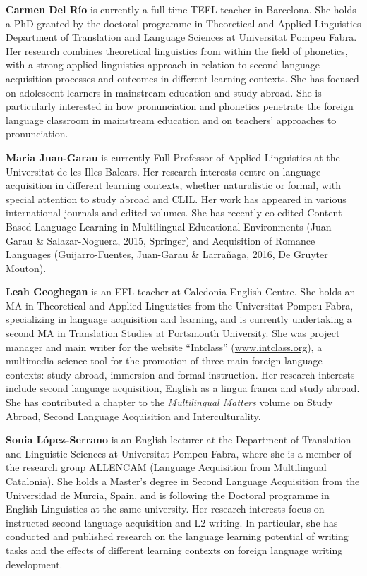 \textbf{Carmen Del Río} is currently a full-time TEFL teacher in Barcelona. She holds a PhD granted by the doctoral programme in Theoretical and Applied {Linguistics} Department of Translation and Language Sciences at Universitat Pompeu Fabra. Her research combines theoretical linguistics from within the field of phonetics, with a strong applied linguistics approach in relation to second language {acquisition} processes and outcomes in different learning contexts. She has focused on adolescent learners in mainstream education and study abroad. She is particularly interested in how {pronunciation} and phonetics penetrate the {foreign language classroom} in mainstream education and on teachers’ approaches to {pronunciation}. 

\textbf{Maria Juan-Garau} is currently Full Professor of Applied {Linguistics} at the Universitat de les Illes Balears. Her research interests centre on language {acquisition} in different learning contexts, whether naturalistic or formal, with special attention to study abroad and {CLIL}. Her work has appeared in various international journals and edited volumes. She has recently co-edited Content-Based Language Learning in Multilingual Educational Environments (Juan-Garau \& Salazar-Noguera, 2015, Springer) and Acquisition of {Romance} Languages (Gui\-ja\-rro-Fuentes, Juan-Garau \& Larrañaga, 2016, De Gruyter Mouton).

\textbf{Leah Geoghegan} is an {EFL} teacher at Caledonia {English} Centre. She holds an MA in Theoretical and Applied {Linguistics} from the Universitat Pompeu Fabra, specializing in language {acquisition} and learning, and is currently undertaking a second MA in Translation Studies at Portsmouth University. She was project manager and main writer for the website “Intclass” (\href{http://www.intclass.org/}{{www.intclass.org}}), a multimedia science tool for the promotion of three main {foreign language} contexts: study abroad, {immersion} and {formal instruction}. Her research interests include second language {acquisition}, {English} as a {lingua franca} and study abroad. She has contributed a chapter to the \textit{Multilingual Matters} volume on Study {Abroad}, Second Language Acquisition and Interculturality. 
 
\textbf{Sonia López-Serrano} is an {English} lecturer at the Department of Translation and Linguistic Sciences at Universitat Pompeu Fabra, where she is a member of the research group ALLENCAM (Language Acquisition from Multilingual Catalonia). She holds a Master’s degree in Second Language Acquisition from the Universidad de Murcia, Spain, and is following the Doctoral programme in {English} {Linguistics} at the same university. Her research interests focus on instructed second language {acquisition} and {L2} writing. In particular, she has conducted and published research on the language learning potential of writing tasks and the effects of different learning contexts on {foreign language} writing development. 

